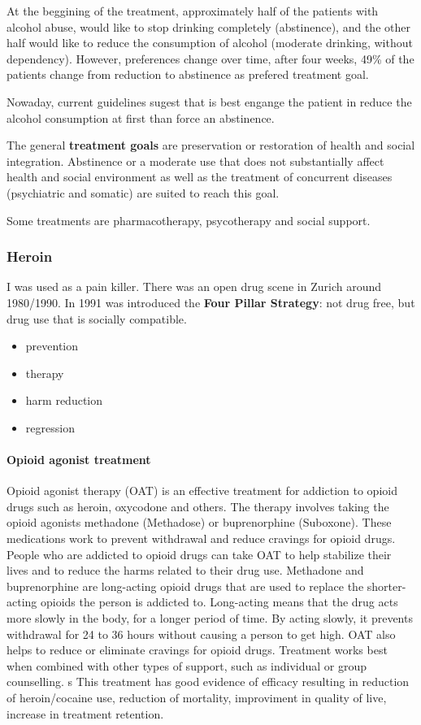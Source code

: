 \documentclass[12pt,article,oneside,a4paper]{memoir}
\begin{document}
At the beggining of the treatment, approximately half of the patients with alcohol abuse, would like to stop drinking completely (abstinence), and the other half would like to reduce the consumption of alcohol (moderate drinking, without dependency). However, preferences change over time, after four weeks, 49\% of the patients change from reduction to abstinence as prefered treatment goal.

Nowaday, current guidelines sugest that is best engange the patient in reduce the alcohol consumption at first than force an abstinence.

The general \textbf{treatment goals} are preservation or restoration of health and social integration. Abstinence or a moderate use that does not substantially affect health and social environment as well as the treatment of concurrent diseases (psychiatric and somatic) are suited to reach this goal.

Some treatments are pharmacotherapy, psycotherapy and social support.

\subsubsection{Heroin}
I was used as a pain killer. There was an open drug scene in Zurich around 1980/1990.
In 1991 was introduced the \textbf{Four Pillar Strategy}: not drug free, but drug use that is socially compatible.
\begin{itemize}
\item prevention
\item therapy
\item harm reduction
\item regression
\end{itemize}

\paragraph{Opioid agonist treatment}
Opioid agonist therapy (OAT) is an effective treatment for addiction to opioid drugs such as heroin, oxycodone and others. The therapy involves taking the opioid agonists methadone (Methadose) or buprenorphine (Suboxone). These medications work to prevent withdrawal and reduce cravings for opioid drugs. People who are addicted to opioid drugs can take OAT to help stabilize their lives and to reduce the harms related to their drug use. 
Methadone and buprenorphine are long-acting opioid drugs that are used to replace the shorter-acting opioids the person is addicted to. Long-acting means that the drug acts more slowly in the body, for a longer period of time. By acting slowly, it prevents withdrawal for 24 to 36 hours without causing a person to get high. OAT also helps to reduce or eliminate cravings for opioid drugs. Treatment works best when combined with other types of support, such as individual or group counselling. 
s
This treatment has good evidence of efficacy resulting in reduction of heroin/cocaine use, reduction of mortality, improviment in quality of live, increase in treatment retention.
\end{document}
